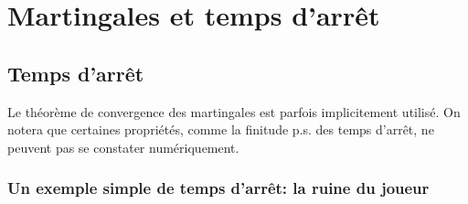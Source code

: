 %
\section{Martingales et temps d'arrêt}\label{se:martingales}
%

%
\subsection{Temps d'arrêt}
\label{ss:tda}
%

Le théorème de convergence des martingales est parfois implicitement utilisé.
On notera que certaines propriétés, comme la finitude p.s. des temps d'arrêt, 
ne peuvent pas se constater numériquement.

%
\subsubsection{Un exemple simple de temps d'arrêt: la ruine du joueur}
%

